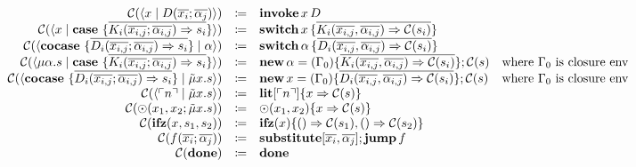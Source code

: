 \[\begin{array}{rcll}
    \mathcal{C}(\langle x \mid D(\overline{x_i}; \overline{\alpha_j}) \rangle) & \coloneq & \mathbf{invoke}\, x\, D \\
    \mathcal{C}(\langle x \mid \mathbf{case}\ \{ \overline{K_i(\overline{x_{i,j}}; \overline{\alpha_{i,j}}) \Rightarrow s_i} \} \rangle) & \coloneq & \mathbf{switch}\, x\, \{ \overline{K_i(\overline{x_{i,j}}, \overline{\alpha_{i,j}}) \Rightarrow \mathcal{C}(s_i)} \} & \\
    \mathcal{C}(\langle \mathbf{cocase}\ \{ \overline{D_i(\overline{x_{i,j}}; \overline{\alpha_{i,j}}) \Rightarrow s_i} \} \mid \alpha \rangle) & \coloneq & \mathbf{switch}\, \alpha\, \{ \overline{D_i(\overline{x_{i,j}}, \overline{\alpha_{i,j}}) \Rightarrow \mathcal{C}(s_i)} \} & \\
    \mathcal{C}(\langle \mu\alpha.s \mid \mathbf{case}\ \{ \overline{K_i(\overline{x_{i,j}}; \overline{\alpha_{i,j}}) \Rightarrow s_i} \} \rangle) & \coloneq & \mathbf{new}\, \alpha = (\Gamma_0)\{ \overline{K_i(\overline{x_{i,j}}, \overline{\alpha_{i,j}}) \Rightarrow \mathcal{C}(s_i)} \}; \mathcal{C}(s) & \text{where } \Gamma_0 \text{ is closure env} \\
    \mathcal{C}(\langle \mathbf{cocase}\ \{ \overline{D_i(\overline{x_{i,j}}; \overline{\alpha_{i,j}}) \Rightarrow s_i} \} \mid \tilde{\mu}x.s \rangle) & \coloneq & \mathbf{new}\, x = (\Gamma_0)\{ \overline{D_i(\overline{x_{i,j}}, \overline{\alpha_{i,j}}) \Rightarrow \mathcal{C}(s_i)} \}; \mathcal{C}(s) & \text{where } \Gamma_0 \text{ is closure env} \\
    \mathcal{C}(\langle \ulcorner n \urcorner \mid \tilde{\mu}x.s \rangle) & \coloneq & \mathbf{lit}[\ulcorner n \urcorner]\{ x \Rightarrow \mathcal{C}(s) \} & \\
    \mathcal{C}(\odot(x_1, x_2; \tilde{\mu}x.s)){} & \coloneq & \odot(x_1, x_2)\{ x \Rightarrow \mathcal{C}(s) \} & \\
    \mathcal{C}(\mathbf{ifz}(x, s_1, s_2)){} & \coloneq & \mathbf{ifz}(x)\{ () \Rightarrow \mathcal{C}(s_1), () \Rightarrow \mathcal{C}(s_2) \} & \\
    \mathcal{C}(f(\overline{x_i}; \overline{\alpha_j})){} & \coloneq & \mathbf{substitute}[\overline{x_i}, \overline{\alpha_j}]; \mathbf{jump}\, f & \\
    \mathcal{C}(\mathbf{done}){} & \coloneq & \mathbf{done} & \\
  \end{array}
\]
